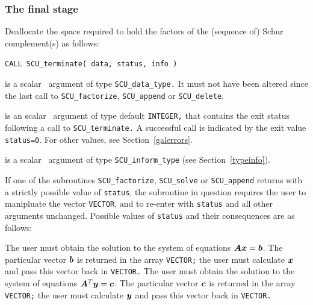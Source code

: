 \documentclass{galahad}
\newcommand{\packagename}{SCU}
\begin{document}

\subsubsection{The final stage}
Deallocate the space required to hold the factors of the 
(sequence of) Schur complement(s) as follows:
\vspace*{1mm}

\hskip0.5in 
{\tt CALL \packagename\_terminate( data, status, info )}

\vspace*{-2mm}
\begin{description}
 is a scalar \intentinout\ argument of type 
{\tt \packagename\_data\_type.} 
It must not have been altered since the last call to  
{\tt \packagename\_factorize}, 
{\tt \packagename\_append} or {\tt \packagename\_delete}. 
 
 is an scalar \intentout\ argument of type default 
{\tt INTEGER,} that  
contains the exit status following a call to {\tt \packagename\_terminate.} 
A successful call is indicated by the exit value {\tt status=0}. 
For other values, see Section~\ref{galerrors}. 
 
 is a scalar \intentout\ argument of type 
{\tt \packagename\_inform\_type} 
(see Section~\ref{typeinfo}). 
 

\end{description}


\galreverse
If one of the subroutines 
{\tt \packagename\_factorize},  
{\tt \packagename\_solve} or  
{\tt \packagename\_append} 
returns with a strictly possible value of {\tt status},  
the subroutine in question requires the user to manipluate the vector  
{\tt VECTOR}, and to re-enter with {\tt status} and all other arguments 
unchanged. 
Possible values of {\tt status} and their consequences are as follows: 

\begin{description} 
 The user must obtain the solution to the system of equations 
$ {\bm{A}} {\bm{x}}  =  {\bm{b}}$. 
The particular vector ${\bm{b}}$ is returned in the array {\tt VECTOR;} 
the user must calculate ${\bm{x}}$ and pass this vector back in {\tt VECTOR.} 
 The user must obtain the solution to the system of equations 
$ {\bm{A}}^T {\bm{y}}  =  {\bm{c}}$. 
The particular vector ${\bm{c}}$ is returned in the array {\tt VECTOR;} 
the user must calculate ${\bm{y}}$ and pass this vector back in {\tt VECTOR.} 
\end{description} 
\end{document}
